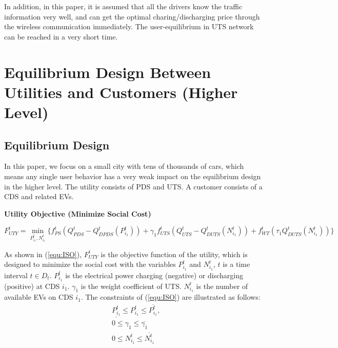 \documentclass[final]{IEEEtran}
\begin{document}
In addition, in this paper, it is assumed that all the drivers know the traffic information very well, and can get the optimal charing/discharging price through the wireless communication immediately. The user-equilibrium in UTS network can be reached in a very short time.

\section{Equilibrium Design Between Utilities and Customers (Higher Level)}\label{Sec:Equilibrium}

\subsection{Equilibrium Design}
In this paper, we focus on a small city with tens of thousands of cars, which means any single user behavior has a very weak impact on the equilibrium design in the higher level. The utility consists of PDS and UTS. A customer consists of a CDS and related EVs.

\textbf{Utility Objective (Minimize Social Cost)}
\begin{figure*}[!t]
	\begin{equation}\label{equ:ISO}
		F^t_{UTY} = \min_{P^t_{i_1}, N^t_{i_1}} \bigg\{ f^t_{PS} (Q^t_{PDS} - Q^t_{DPDS} (P^t_{i_1})) 
		  + \gamma_1 f^t_{UTS}(Q^t_{UTS} - Q^t_{DUTS} (N^t_{i_1})) + f^t_{WT}(\tau_1 Q^t_{DUTS} (N^t_{i_1})) \bigg\}
	\end{equation}
	\vspace*{0.0in}
\end{figure*} 

As shown in (\ref{equ:ISO}), $F^t_{UTY}$ is the objective function of the utility, which is designed to minimize the social cost with the variables $P^t_{i_1}$ and $N^t_{i_1}$, $t$ is a time interval $t\in D_t$. $P^t_{i_1}$ is the electrical power charging (negative) or discharging (positive) at CDS $i_1$. $\gamma_1$ is the weight coefficient of UTS. $N^t_{i_1}$ is the number of available EVs on CDS $i_1$. 
The constraints of (\ref{equ:ISO}) are illustrated as follows:
\begin{subequations}\label{equ:ISOcon}
	\begin{align}
	& \underline{P^t_{i_1}}\leq P^t_{i_1} \leq \overline{P^t_{i_1}},  \label{equ:ISO1} \\
	& 0 \leq \gamma_1 \leq \overline{\gamma_1} \label{equ:ISO2} \\
	& 0 \leq N^t_{i_1} \leq \overline{N^t_{i_1}} \label{equ:ISO3}
	\end{align}
\end{subequations}
\end{document}
